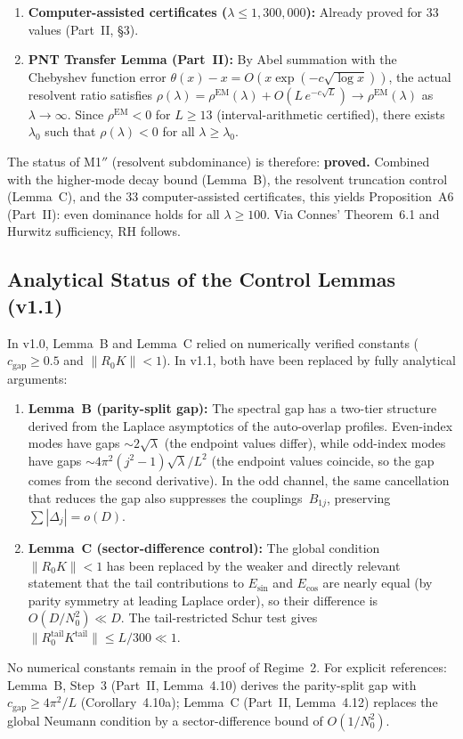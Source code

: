 \documentclass[12pt,a4paper]{article}
\theoremstyle{definition}
\theoremstyle{remark}
\begin{document}
\begin{enumerate}
  \item \textbf{Computer-assisted certificates ($\lambda \leq 1{,}300{,}000$):} Already proved for $33$ values (Part~II, \S3).
  \item \textbf{PNT Transfer Lemma (Part~II):} By Abel summation with the Chebyshev function error $\theta(x) - x = O(x\exp(-c\sqrt{\log x}))$, the actual resolvent ratio satisfies $\rho(\lambda) = \rho^{\mathrm{EM}}(\lambda) + O(L\,e^{-c\sqrt{L}}) \to \rho^{\mathrm{EM}}(\lambda)$ as $\lambda \to \infty$. Since $\rho^{\mathrm{EM}} < 0$ for $L \geq 13$ (interval-arithmetic certified), there exists $\lambda_0$ such that $\rho(\lambda) < 0$ for all $\lambda \geq \lambda_0$.
\end{enumerate}

\noindent The status of M1$''$ (resolvent subdominance) is therefore: \textbf{proved.} Combined with the higher-mode decay bound (Lemma~B), the resolvent truncation control (Lemma~C), and the $33$ computer-assisted certificates, this yields Proposition~A6 (Part~II): even dominance holds for all $\lambda \geq 100$. Via Connes' Theorem~6.1 and Hurwitz sufficiency, RH follows.

\subsection{Analytical Status of the Control Lemmas (v1.1)}

In v1.0, Lemma~B and Lemma~C relied on numerically verified constants ($c_{\mathrm{gap}} \geq 0.5$ and $\|R_0 K\| < 1$). In v1.1, both have been replaced by fully analytical arguments:
\begin{enumerate}
  \item \textbf{Lemma~B (parity-split gap):} The spectral gap has a two-tier structure derived from the Laplace asymptotics of the auto-overlap profiles. Even-index modes have gaps $\sim 2\sqrt{\lambda}$ (the endpoint values differ), while odd-index modes have gaps $\sim 4\pi^2(j^2-1)\sqrt{\lambda}/L^2$ (the endpoint values coincide, so the gap comes from the second derivative). In the odd channel, the same cancellation that reduces the gap also suppresses the couplings~$B_{1j}$, preserving $\sum |\Delta_j| = o(D)$.
  \item \textbf{Lemma~C (sector-difference control):} The global condition $\|R_0 K\| < 1$ has been replaced by the weaker and directly relevant statement that the tail contributions to $E_{\sin}$ and $E_{\cos}$ are nearly equal (by parity symmetry at leading Laplace order), so their difference is $O(D/N_0^2) \ll D$. The tail-restricted Schur test gives $\|R_0^{\mathrm{tail}} K^{\mathrm{tail}}\| \leq L/300 \ll 1$.
\end{enumerate}
No numerical constants remain in the proof of Regime~2. For explicit references: Lemma~B, Step~3 (Part~II, Lemma~4.10) derives the parity-split gap with $c_{\mathrm{gap}} \geq 4\pi^2/L$ (Corollary~4.10a); Lemma~C (Part~II, Lemma~4.12) replaces the global Neumann condition by a sector-difference bound of $O(1/N_0^2)$.
\end{document}
